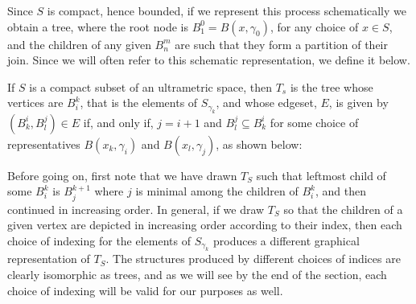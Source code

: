 Since $S$ is compact, hence bounded, if we represent this process schematically we obtain a tree, where the root node is $B^0_1=B(x,\gamma_0)$, for any choice of $x \in S$, and the children of any given $B^m_n$ are such that they form a partition of their join.  Since we will often refer to this schematic representation, we define it below.

\begin{definition*}
If $S$ is a compact subset of an ultrametric space, then $T_s$ is the tree whose vertices are $B^k_i$, that is the elements of $S_{\gamma_k}$, and whose edgeset, $E$, is given by $ (B^i_k, B^j_l) \in E$ if, and only if, $ j = i+1$ and $B^j_l \subseteq B^i_k$ for some choice of representatives $B(x_k,\gamma_i)$ and $B(x_l, \gamma_j)$, as shown below:\\

\tikzset{font=\small,
level distance=1.75cm,
}

\begin{center}
\end{center}
\end{definition*}

Before going on, first note that we have drawn $T_S$ such that leftmost child of some $B^k_i$ is $B^{k+1}_j$ where $j$ is minimal among the children of $B^k_i$, and then continued in increasing order. In general, if we draw $T_S$ so that the children of a given vertex are depicted in increasing order according to their index, then  each choice of indexing for the elements of $S_{\gamma_k}$ produces a different graphical representation of $T_S$. The structures produced by different choices of indices are clearly isomorphic as trees, and as we will see by the end of the section, each choice of indexing will be valid for our purposes as well.\\

